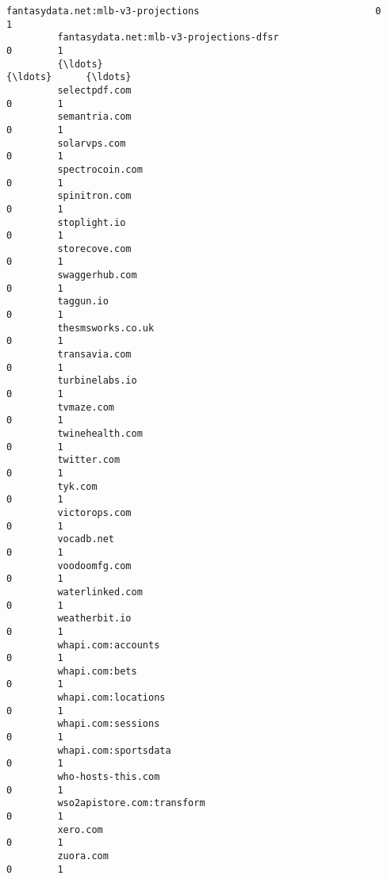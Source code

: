 \documentclass[11pt]{article}
\begin{document}
\begin{Verbatim}[commandchars=\\\{\}]
         fantasydata.net:mlb-v3-projections                               0        1   
         fantasydata.net:mlb-v3-projections-dfsr                          0        1   
         {\ldots}                                                            {\ldots}      {\ldots}   
         selectpdf.com                                                    0        1   
         semantria.com                                                    0        1   
         solarvps.com                                                     0        1   
         spectrocoin.com                                                  0        1   
         spinitron.com                                                    0        1   
         stoplight.io                                                     0        1   
         storecove.com                                                    0        1   
         swaggerhub.com                                                   0        1   
         taggun.io                                                        0        1   
         thesmsworks.co.uk                                                0        1   
         transavia.com                                                    0        1   
         turbinelabs.io                                                   0        1   
         tvmaze.com                                                       0        1   
         twinehealth.com                                                  0        1   
         twitter.com                                                      0        1   
         tyk.com                                                          0        1   
         victorops.com                                                    0        1   
         vocadb.net                                                       0        1   
         voodoomfg.com                                                    0        1   
         waterlinked.com                                                  0        1   
         weatherbit.io                                                    0        1   
         whapi.com:accounts                                               0        1   
         whapi.com:bets                                                   0        1   
         whapi.com:locations                                              0        1   
         whapi.com:sessions                                               0        1   
         whapi.com:sportsdata                                             0        1   
         who-hosts-this.com                                               0        1   
         wso2apistore.com:transform                                       0        1   
         xero.com                                                         0        1   
         zuora.com                                                        0        1   
         

\end{Verbatim}
\end{document}
